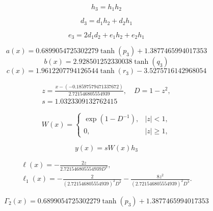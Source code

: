 \begin{equation}
h_{3}=h_{1} h_{2}
\end{equation}


\begin{equation}
d_{3}=d_{1} h_{2} + d_{2} h_{1}
\end{equation}


\begin{equation}
e_{3}=2 d_{1} d_{2} + e_{1} h_{2} + e_{2} h_{1}
\end{equation}


\begin{equation}
a(x)=0.6899054725302279 \tanh{\left(p_{3} \right)} + 1.3877465994017353
\end{equation}
\begin{equation}
b(x)=2.928501252330038 \tanh{\left(q_{3} \right)}
\end{equation}
\begin{equation}
c(x)=1.9612207794126544 \tanh{\left(r_{3} \right)} - 3.5275716142968054
\end{equation}


\begin{equation}
\begin{aligned}z=\frac{x-(-0.18597579471337672)}{2.721546805554939},\quad D=1-z^2,\\s=1.0323309132762415\end{aligned}
\end{equation}


\begin{equation}
W(x)=\begin{cases}\exp(1-D^{-1}),&|z|<1,\\0,&|z|\ge1,\end{cases}
\end{equation}


\begin{equation}\label{eq:ex7-solution}
y(x)=sW(x)h_{3}
\end{equation}


\begin{equation}
\begin{aligned}\ell(x)=-\frac{2z}{2.721546805554939D^2},\\\ell_1(x)=-\frac{2}{(2.721546805554939)^2D^2}-\frac{8z^2}{(2.721546805554939)^2D^3}.\end{aligned}
\end{equation}


\begin{equation}
\Gamma_2(x)=0.6899054725302279 \tanh{\left(p_{3} \right)} + 1.3877465994017353
\end{equation}


